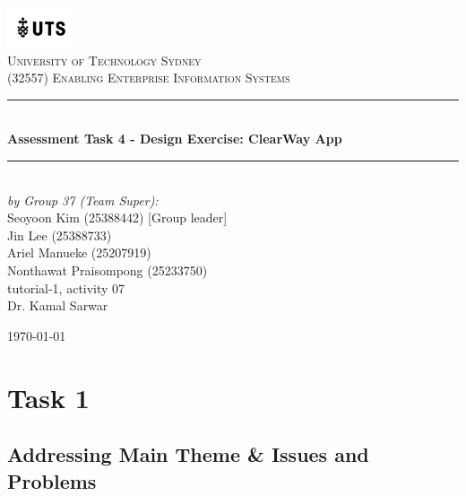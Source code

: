 \documentclass[12pt,a4paper]{article}
\begin{document}

\begin{titlepage}

\newcommand{\HRule}{\rule{\linewidth}{0.5mm}}
\center

\vspace*{1\baselineskip}
\includegraphics[width=0.15\textwidth]{images/UTS.png}\\
\textsc{\LARGE University of Technology Sydney}\\[2.0cm]
\textsc{\Large (32557) Enabling Enterprise Information Systems}\\[0.2cm]

\HRule\\[0.6cm]
{\huge\bfseries Assessment Task 4 - Design Exercise: ClearWay App}\\[0.4cm]
\HRule\\[8cm]

\emph{by Group 37 (Team Super):} \\
{Seoyoon Kim (25388442) [Group leader]} \\
{Jin Lee (25388733)}  \\
{Ariel Manueke (25207919)} \\
{Nonthawat Praisompong (25233750)}\\[0.4cm]
{tutorial-1, activity 07}\\
{Dr. Kamal Sarwar}


\vfill
{\large\today}

\vfill

\end{titlepage}


\tableofcontents
\thispagestyle{nofooter}
\cleardoublepage

\pagebreak




\setcounter{page}{1}
\label{sec:Question 1}
\section{Task 1}

\subsection{Addressing Main Theme \& Issues and Problems}
\end{document}

